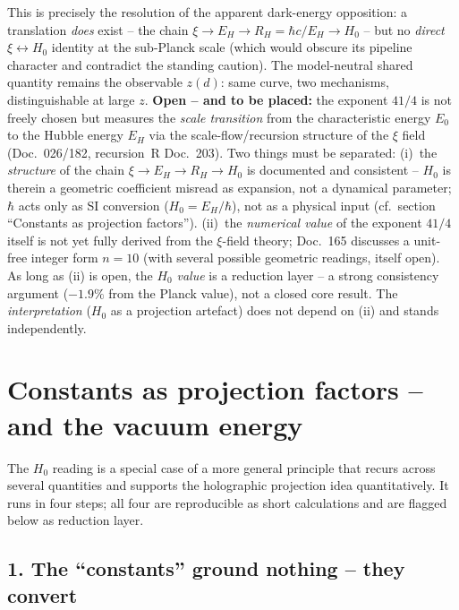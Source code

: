 This is precisely the resolution of the apparent dark-energy opposition: a
translation \emph{does} exist -- the chain $\xi \to E_H \to R_H = \hbar c/E_H
\to H_0$ -- but no \emph{direct} $\xi \leftrightarrow H_0$ identity at the
sub-Planck scale (which would obscure its pipeline character and contradict
the standing caution). The model-neutral shared quantity remains the
observable $z(d)$: same curve, two mechanisms, distinguishable at large $z$.
\textbf{Open -- and to be placed:} the exponent $41/4$ is not freely chosen but
measures the \emph{scale transition} from the characteristic energy $E_0$ to
the Hubble energy $E_H$ via the scale-flow/recursion structure of the $\xi$
field (Doc.~026/182, recursion~R Doc.~203). Two things must be separated:
(i)~the \emph{structure} of the chain $\xi\to E_H\to R_H\to H_0$ is documented
and consistent -- $H_0$ is therein a geometric coefficient misread as
expansion, not a dynamical parameter; $\hbar$ acts only as SI conversion
($H_0=E_H/\hbar$), not as a physical input (cf.\ section \enquote{Constants as
projection factors}). (ii)~the \emph{numerical value} of the exponent $41/4$
itself is not yet fully derived from the $\xi$-field theory; Doc.~165 discusses
a unit-free integer form $n=10$ (with several possible geometric readings,
itself open). As long as (ii) is open, the $H_0$ \emph{value} is a reduction
layer -- a strong consistency argument ($-1.9\%$ from the Planck value), not a
closed core result. The \emph{interpretation} ($H_0$ as a projection artefact)
does not depend on (ii) and stands independently.


\section{Constants as projection factors -- and the vacuum energy}

The $H_0$ reading is a special case of a more general principle that recurs
across several quantities and supports the holographic projection idea
quantitatively. It runs in four steps; all four are reproducible as short
calculations and are flagged below as reduction layer.

\subsection*{1. The \enquote{constants} ground nothing -- they convert}

